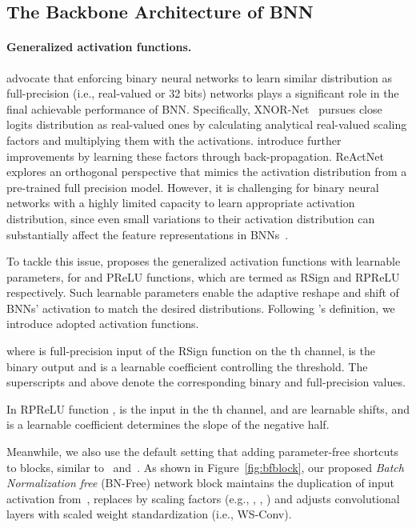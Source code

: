 \documentclass[final]{cvpr}
\begin{document}
\subsection{The Backbone Architecture of BNN} \label{sec:bnn_arch}
\paragraph{Generalized activation functions.} \cite{rastegari2016xnor,xu2019accurate,bulat2019xnor,liu2020reactnet} advocate that enforcing binary neural networks to learn similar distribution as full-precision (i.e., real-valued or 32 bits) networks plays a significant role in the final achievable performance of BNN. Specifically, XNOR-Net~\cite{rastegari2016xnor} pursues close logits distribution as real-valued ones by calculating analytical real-valued scaling factors and multiplying them with the activations. \cite{xu2019accurate,bulat2019xnor} introduce further improvements by learning these factors through back-propagation. ReActNet~\cite{liu2020reactnet} explores an orthogonal perspective that mimics the activation distribution from a pre-trained full precision model. However, it is challenging for binary neural networks with a highly limited capacity to learn appropriate activation distribution, since even small variations to their activation distribution can substantially affect the feature representations in BNNs~\cite{liu2020reactnet}.

To tackle this issue, \cite{liu2020reactnet} proposes the generalized activation functions with learnable parameters, for  and PReLU \cite{he2015delving} functions, which are termed as RSign and RPReLU respectively. Such learnable parameters enable the adaptive reshape and shift of BNNs' activation to match the desired distributions. Following \cite{liu2020reactnet}'s definition, we introduce adopted activation functions.


where  is full-precision input of the RSign function  on the th channel,  is the binary output and  is a learnable coefficient controlling the threshold. The superscripts  and  above  denote the corresponding binary and full-precision values.


In RPReLU function ,  is the input in the th channel,  and  are learnable shifts, and  is a learnable coefficient determines the slope of the negative half.

Meanwhile, we also use the default setting that adding parameter-free shortcuts to blocks, similar to~\cite{liu2018bi} and~\cite{liu2020reactnet}. As shown in Figure~\ref{fig:bfblock}, our proposed \textit{Batch Normalization free} (BN-Free) network block maintains the duplication of input activation from~\cite{liu2020reactnet}, replaces by scaling factors (e.g., , , ) and adjusts convolutional layers with scaled weight standardization (i.e., WS-Conv).
\end{document}
